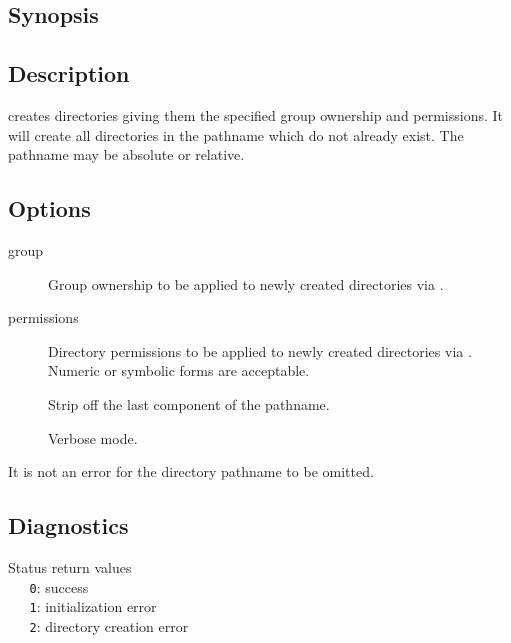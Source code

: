 \subsection*{Synopsis}

\begin{synopsis}
\end{synopsis}

\subsection*{Description}

 creates directories giving them the specified group ownership and
permissions.  It will create all directories in the pathname which do not
already exist.  The pathname may be absolute or relative.

\subsection*{Options}

\begin{description}
\item[ group]
   Group ownership to be applied to newly created directories via
   .

\item[ permissions]
   Directory permissions to be applied to newly created directories via
   .  Numeric or symbolic forms are acceptable.

\item[]
   Strip off the last component of the pathname.

\item[]
   Verbose mode.
\end{description}

\noindent
It is not an error for the directory pathname to be omitted.

\subsection*{Diagnostics}

Status return values
\\ \verb+   0+:  success
\\ \verb+   1+:  initialization error
\\ \verb+   2+:  directory creation error


